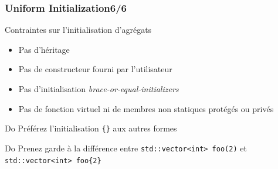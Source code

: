 \documentclass[C++.tex]{subfiles}
\begin{document}
\begin{frame}[fragile]
	\frametitle{Uniform Initialization\titlehfill{}6/6}
	\begin{alertblock}{Contraintes sur l'initialisation d'agrégats}
		\begin{itemize}
			\item Pas d'héritage
			\item Pas de constructeur fourni par l'utilisateur
			\item Pas d'initialisation \textit{brace-or-equal-initializers}
			\item Pas de fonction virtuel ni de membres non statiques protégés ou privés
		\end{itemize}

	\end{alertblock}

	\begin{exampleblock}{Do}
		Préférez l'initialisation \lstinline|{}| aux autres formes

	\end{exampleblock}

	\begin{exampleblock}{Do}
		Prenez garde à la différence entre \lstinline|std::vector<int> foo(2)| et \lstinline|std::vector<int> foo{2}|
	\end{exampleblock}
\end{frame}
\end{document}
